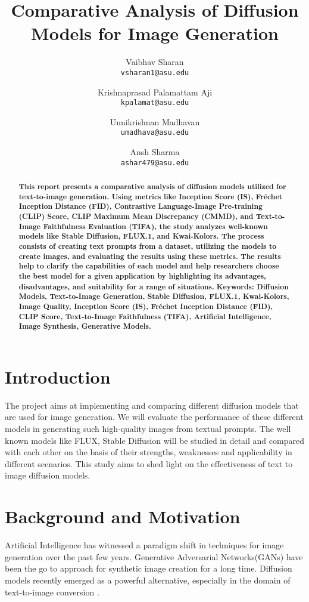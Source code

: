 \documentclass{article}
\title{Comparative Analysis of Diffusion Models for Image Generation
}
\author{
  Vaibhav Sharan\\
  \texttt{vsharan1@asu.edu} \\ 
  \and
  Krishnaprasad Palamattam Aji\\
  \texttt{kpalamat@asu.edu}\\
  \and
  Unnikrishnan Madhavan\\
  \texttt{umadhava@asu.edu}\\
  \and
  Ansh Sharma\\
  \texttt{ashar479@asu.edu}
}
\begin{document}
\maketitle

\begin{abstract}
    \textbf{This report presents a comparative analysis of diffusion models utilized for text-to-image generation. Using metrics like Inception Score (IS), Fréchet Inception Distance (FID), Contrastive Language-Image Pre-training (CLIP) Score, CLIP Maximum Mean Discrepancy (CMMD), and Text-to-Image Faithfulness Evaluation (TIFA), the study analyzes well-known models like Stable Diffusion, FLUX.1, and Kwai-Kolors. The process consists of creating text prompts from a dataset, utilizing the models to create images, and evaluating the results using these metrics. The results help to clarify the capabilities of each model and help researchers choose the best model for a given application by highlighting its advantages, disadvantages, and suitability for a range of situations.}
    \textbf{Keywords: Diffusion Models, Text-to-Image Generation, Stable Diffusion, FLUX.1, Kwai-Kolors, Image Quality, Inception Score (IS), Fréchet Inception Distance (FID), CLIP Score, Text-to-Image Faithfulness (TIFA), Artificial Intelligence, Image Synthesis, Generative Models.}
\end{abstract}

\section{Introduction}
The project aims at implementing and comparing different diffusion models that are used for 
image generation. We will evaluate the performance of these different models in generating
such high-quality images from textual prompts. The well known models like FLUX, Stable
Diffusion will be studied in detail and compared with each other on the basis of
their strengths, weaknesses and applicability in different scenarios. This study aims to shed light
on the effectiveness of text to image diffusion models.


\section{Background and Motivation}
Artificial Intelligence has witnessed a paradigm shift in techniques for image generation over the past few years. 
Generative Adversarial Networks(GANs) have been the go to approach for synthetic image creation for a long time. 
Diffusion models recently emerged as a powerful alternative, especially in the domain of text-to-image conversion \cite{dhariwal2021}. 
\end{document}
